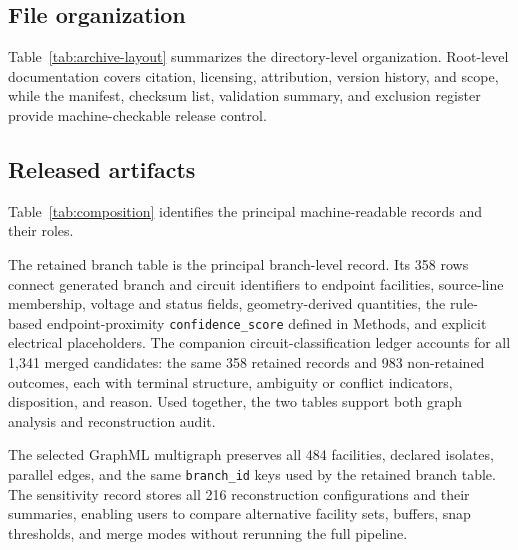 \documentclass[10pt]{article}
\newcommand{\dataset}{\textsc{PT60-Candidate}\xspace}
\newcommand{\code}[1]{\texttt{#1}}
\begin{document}
\subsection{File organization}

Table~\ref{tab:archive-layout} summarizes the directory-level organization. Root-level documentation covers citation, licensing, attribution, version history, and scope, while the manifest, checksum list, validation summary, and exclusion register provide machine-checkable release control.

\begin{table}[t]
\centering
\small
\caption{Directory structure of the \dataset{} archive. Counts refer to files, not data rows.}
\label{tab:archive-layout}

\end{table}

\subsection{Released artifacts}

Table~\ref{tab:composition} identifies the principal machine-readable records and their roles.

\begin{table}[t]
\centering
\small
\caption{Principal machine-readable artifacts in the deposited archive. Paths are relative to the archive root.}
\label{tab:composition}

\end{table}

The retained branch table is the principal branch-level record. Its 358 rows connect generated branch and circuit identifiers to endpoint facilities, source-line membership, voltage and status fields, geometry-derived quantities, the rule-based endpoint-proximity \code{confidence\_score} defined in Methods, and explicit electrical placeholders. The companion circuit-classification ledger accounts for all 1,341 merged candidates: the same 358 retained records and 983 non-retained outcomes, each with terminal structure, ambiguity or conflict indicators, disposition, and reason. Used together, the two tables support both graph analysis and reconstruction audit.

The selected GraphML multigraph preserves all 484 facilities, declared isolates, parallel edges, and the same \code{branch\_id} keys used by the retained branch table. The sensitivity record stores all 216 reconstruction configurations and their summaries, enabling users to compare alternative facility sets, buffers, snap thresholds, and merge modes without rerunning the full pipeline.
\end{document}
